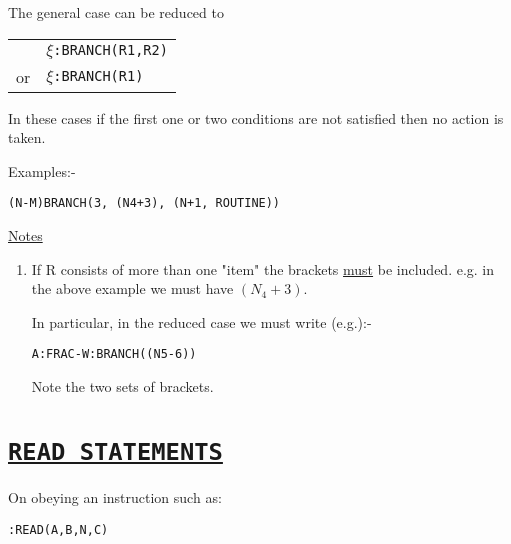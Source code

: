 \documentclass[10pt, a4paper, oneside]{article}
\newcommand{\myuline}[1]{\uline{#1}}
\newcommand{\mytt}[1]{\texttt{\scriptsize #1}}
\newcommand{\mytt}[1]{\texttt{\small #1}}
\begin{document}
\begin{multicols}{2}
The general case can be reduced to \\

\begin{addmargin}[1cm]{1em}%
\begin{tabular}{ll}
   & $\xi$\mytt{:BRANCH(R1,R2)} \\
or & $\xi$\mytt{:BRANCH(R1)} \\
\end{tabular}
\end{addmargin}
\vspace{1em}

In these cases if the first one or two conditions
are not satisfied then no action is taken.
\vspace{1ex}

Examples:-

\begin{addmargin}[1cm]{1em}%
\begin{lstlisting}
(N-M)BRANCH(3, (N4+3), (N+1, ROUTINE))
\end{lstlisting}
\end{addmargin}

\begin{flushleft}
\myuline{Notes}
\end{flushleft}

\renewcommand{\labelenumi}{(\theenumi)}
\begin{enumerate}

\item If R consists of more than one "item" the brackets
\myuline{must} be included.  e.g. in the above example we must
have $(N_{4}+3)$.

In particular, in the reduced case we must write
(e.g.):-

\begin{addmargin}[1cm]{1em}%
\begin{lstlisting}
A:FRAC-W:BRANCH((N5-6))
\end{lstlisting}
\end{addmargin}

Note the two sets of brackets.
\end{enumerate}


\section{\myuline{\mytt{READ STATEMENTS}}}

On obeying an instruction such as:

\begin{addmargin}[1cm]{1em}%
\begin{lstlisting}
:READ(A,B,N,C)
\end{lstlisting}
\end{addmargin}


\end{multicols}
\end{document}
